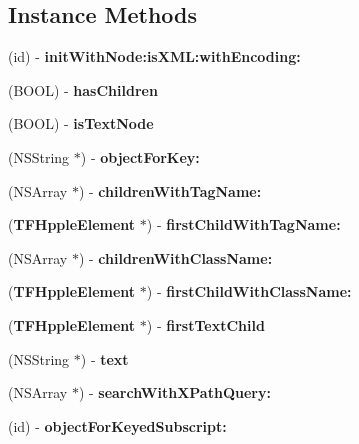 \subsection*{Instance Methods}
\begin{DoxyCompactItemize}
\item 
(id) -\/ {\bfseries init\+With\+Node\+:is\+X\+M\+L\+:with\+Encoding\+:}\label{interface_t_f_hpple_element_a96f0b88ecc6a2d995db83adc29c651a0}

\item 
(B\+O\+O\+L) -\/ {\bfseries has\+Children}\label{interface_t_f_hpple_element_ad3bc62dda4b012f0fa3db18de0fc4bdb}

\item 
(B\+O\+O\+L) -\/ {\bfseries is\+Text\+Node}\label{interface_t_f_hpple_element_aa8dfd3d004a8426a8768d0b9895be6c8}

\item 
(N\+S\+String $\ast$) -\/ {\bfseries object\+For\+Key\+:}\label{interface_t_f_hpple_element_aed2c4dacaa682b1922bb04ef4aa44994}

\item 
(N\+S\+Array $\ast$) -\/ {\bfseries children\+With\+Tag\+Name\+:}\label{interface_t_f_hpple_element_a4ec6f4d6b0cb04ed9a19c392226034bd}

\item 
({\bf T\+F\+Hpple\+Element} $\ast$) -\/ {\bfseries first\+Child\+With\+Tag\+Name\+:}\label{interface_t_f_hpple_element_a54c3359b7e1ca0bca26c4e6ff0473c9b}

\item 
(N\+S\+Array $\ast$) -\/ {\bfseries children\+With\+Class\+Name\+:}\label{interface_t_f_hpple_element_a33bda9b36b3a6b6cb8aa3191e4d8081d}

\item 
({\bf T\+F\+Hpple\+Element} $\ast$) -\/ {\bfseries first\+Child\+With\+Class\+Name\+:}\label{interface_t_f_hpple_element_ae19ca4aaac4865f61f02e81869394c76}

\item 
({\bf T\+F\+Hpple\+Element} $\ast$) -\/ {\bfseries first\+Text\+Child}\label{interface_t_f_hpple_element_a73a7c62150c93492a29364763a0e2704}

\item 
(N\+S\+String $\ast$) -\/ {\bfseries text}\label{interface_t_f_hpple_element_a45cde91bb698bdbb03f4c48a896b031a}

\item 
(N\+S\+Array $\ast$) -\/ {\bfseries search\+With\+X\+Path\+Query\+:}\label{interface_t_f_hpple_element_af82deb9f4a9a92339829b9bab17ab9b9}

\item 
(id) -\/ {\bfseries object\+For\+Keyed\+Subscript\+:}\label{interface_t_f_hpple_element_ae1c9cc9af79c5a5b41d19188444a43f7}

\end{DoxyCompactItemize}
